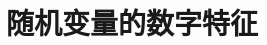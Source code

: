 \section{随机变量的数字特征}

\begin{comment}
\begin{question}{例题5}
    设随机变量 $X$ 服从瑞利分布，即其概率密度为
    $$
        f(x) = \begin{dcases}
            \frac{x}{\sigma^2} \mathrm{e}^{-\frac{x^2}{2\sigma^2}}, & x>0,           \\
            0,                                                      & x \leqslant 0.
        \end{dcases}
    $$
    其中 $\sigma>0$ 是常数，求 $E(X), D(X)$.
\end{question}
\begin{solution}
    根据概率密度的定义，其数学期望为
    $$
        E(X) = \int_{-\infty}^{+\infty} xf(x) \ \mathrm{d}x
        = \int_{0}^{+\infty} \frac{x^2}{\sigma^2} \mathrm{e}^{-\frac{x^2}{2\sigma^2}} \ \mathrm{d}x
        = \sqrt{\frac{\pi}{2}}\sigma
    $$
    根据方差的性质
    $$
        \begin{aligned}
            D(X)
             & = E\left(X^2\right) - E^2(X)                                                                                       \\
             & = \int_0^{+\infty} x^2 f(x) \,\mathrm{d}x - \left(\sqrt{\frac{\pi}{2}}\sigma\right)^2                              \\
             & = \int_0^{+\infty} x^2\frac{x}{\sigma^2} \mathrm{e}^{-\frac{x^2}{2\sigma^2}} \,\mathrm{d}x - \frac{\pi}{2}\sigma^2 \\
             & = 2\sigma^2\int_0^{+\infty}\frac{x^2}{2\sigma^2}
            \mathrm{e}^{-\frac{x^2}{2\sigma^2}} \,\mathrm{d}\left(\frac{x^2}{2\sigma^2}\right) - \frac{\pi}{2}\sigma^2            \\
        \end{aligned}
    $$
    令 $\dfrac{x^2}{2\sigma^2} > 0$ 有
    $$
        D(X) = 2\sigma^2\int_0^{+\infty}t \mathrm{e}^{-t} \,\mathrm{d}t - \frac{\pi}{2}\sigma^2 = 2\sigma^2 - \frac{\pi}{2}\sigma^2
    $$
\end{solution}
\end{comment}



